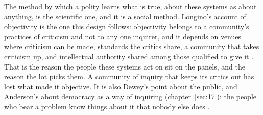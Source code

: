 The method by which a polity learns what is true, about these systems as about anything, is the scientific one, and it is a social method. Longino's account of objectivity is the one this design follows: objectivity belongs to a community's practices of criticism and not to any one inquirer, and it depends on venues where criticism can be made, standards the critics share, a community that takes criticism up, and intellectual authority shared among those qualified to give it \autocite{longino1990science}. That is the reason the people these systems act on sit on the panels, and the reason the lot picks them. A community of inquiry that keeps its critics out has lost what made it objective. It is also Dewey's point about the public, and Anderson's about democracy as a way of inquiring (chapter~\ref{sec:17}): the people who bear a problem know things about it that nobody else does \autocite{dewey1927public,anderson2006epistemology}.
